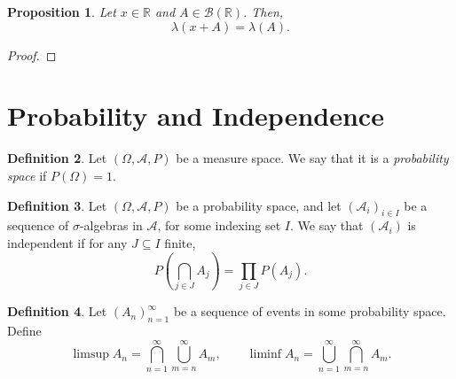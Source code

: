 \documentclass[a4paper, openany]{memoir}
\theoremstyle{definition}
\newtheorem{definition}{Definition}[section]
\theoremstyle{plain}
\newtheorem{proposition}[definition]{Proposition}
\begin{document}
    \begin{proposition}
        Let $x \in \mathbb{R}$ and $A \in \mathcal{B}(\mathbb{R})$. Then, 
        \[\lambda(x + A) = \lambda(A).\]
    \end{proposition}
    \begin{proof}
            
    \end{proof}
    
    \newpage

    \section{Probability and Independence}
    \begin{definition}
        Let $(\Omega, \mathcal{A}, P)$ be a measure space. We say that it is a \emph{probability space} if $P(\Omega) = 1$.
    \end{definition}

    \begin{definition}
        Let $(\Omega, \mathcal{A}, P)$ be a probability space, and let $(\mathcal{A}_i)_{i \in I}$ be a sequence of $\sigma$-algebras in $\mathcal{A}$, for some indexing set $I$. We say that $(\mathcal{A}_i)$ is independent if for any $J \subseteq I$ finite,
        \[P\left(\bigcap_{j \in J} A_j \right) = \prod_{j \in J} P(A_j).\]
    \end{definition}

    \begin{definition}
        Let $(A_n)_{n=1}^\infty$ be a sequence of events in some probability space. Define
        \[\limsup A_n = \bigcap_{n=1}^\infty \bigcup_{m=n}^\infty A_m, \qquad \liminf A_n = \bigcup_{n=1}^\infty \bigcap_{m=n}^\infty A_m.\]
    \end{definition}
\end{document}
